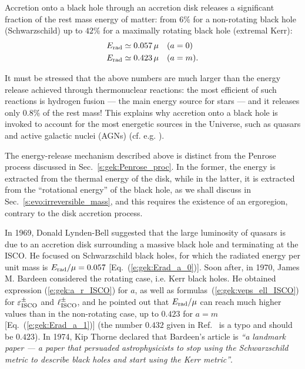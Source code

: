 \begin{prop}
Accretion onto a black hole through an accretion disk releases a significant
fraction of the rest mass energy of matter: from $6\%$ for a non-rotating
black hole (Schwarzschild) up to $42\%$ for a maximally rotating black hole
(extremal Kerr):
\begin{subequations}
\begin{align}
    & E_{\rm rad} \simeq 0.057 \, \mu \quad (a=0)  \label{e:gek:Erad_a_0}\\
    & E_{\rm rad} \simeq 0.423 \, \mu \quad (a=m) . \label{e:gek:Erad_a_1}
\end{align}
\end{subequations}
\end{prop}

It must be stressed that the above numbers are much larger than the energy
release achieved through thermonuclear reactions: the most efficient
of such reactions is hydrogen fusion --- the main energy source for stars --- and
it releases only $0.8\%$ of the rest mass! This explains why accretion onto a
black hole is invoked to account for the most energetic sources in the Universe,
such as quasars and
active galactic nuclei (AGNs)
(cf. e.g. \cite{Colli09}).

\begin{remark}
The energy-release mechanism described above is distinct from the Penrose
process discussed in Sec.~\ref{s:gek:Penrose_proc}. In the former, the
energy is extracted from the thermal energy of the disk, while in the latter,
it is extracted from the ``rotational energy'' of the black hole,
as we shall discuss in Sec.~\ref{s:evo:irreversible_mass},
and this requires the existence of an ergoregion, contrary to the disk accretion
process.
\end{remark}

\begin{hist}
In 1969, Donald Lynden-Bell \cite{Lynde69} suggested
that the large luminosity
of quasars is due to an accretion disk surrounding a massive black hole and
terminating at the ISCO. He focused on Schwarzschild black holes,
for which the radiated energy per unit mass is $E_{\rm rad}/\mu = 0.057$
[Eq.~(\ref{e:gek:Erad_a_0})]. Soon after, in 1970,
James M. Bardeen \cite{Barde70a}
considered the rotating case, i.e. Kerr black holes.
He obtained expression (\ref{e:gek:a_r_ISCO}) for $a$, as well as formulas~(\ref{e:gek:veps_ell_ISCO}) for $\varepsilon_{\rm ISCO}^\pm$
and $\ell_{\rm ISCO}^\pm$, and he pointed out that $E_{\rm rad}/\mu$ can reach much higher values than
in the non-rotating case,
up to $0.423$ for $a=m$ [Eq.~(\ref{e:gek:Erad_a_1})] (the number $0.432$ given in Ref.~\cite{Barde70a} is a typo and should be $0.423$). In 1974, Kip Thorne \cite{Thorn74}
declared that Bardeen's article \cite{Barde70a} is \emph{``a landmark paper --- a paper that persuaded astrophysicists to stop using the
Schwarzschild metric to describe black holes and start using the Kerr metric''}.
\end{hist}

